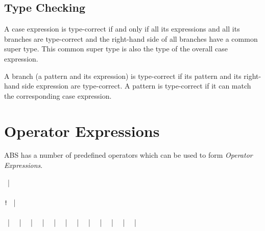 \subsection{Type Checking}
A case expression is type-correct if and only if all its expressions and all its branches are type-correct and the right-hand side of all branches have a common super type. This common super type is also the type of the overall case expression. 

A branch (a pattern and its expression) is type-correct if its pattern and its right-hand side expression are type-correct.
A pattern is type-correct if it can match the corresponding case expression.

\section{Operator Expressions}
ABS has a number of predefined operators which can be used to form \emph{Operator Expressions}.

\begin{abssyntax}
  {}
              ~|~ \\
     {}\ \\
      \verb*_!_ ~|~ \TRS{-}\\
    {}\ \ \\
     \TRS{||} ~|~\TRS{\&\&} ~|~ \TRS{==} ~|~ \TRS{!=} ~|~ \TRS{<} ~|~ \TRS{<=} ~|~ \TRS{>} ~|~ \TRS{>=} ~|~ \TRS{+} ~|~ \TRS{-} ~|~ \TRS{*} ~|~ \TRS{/} ~|~ \TRS{\%}
\end{abssyntax}

